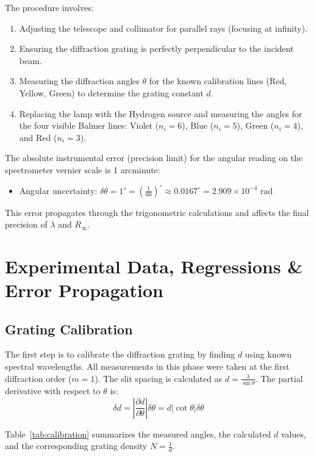 \documentclass[a4paper,11pt]{article}
\begin{document}
The procedure involves:
\begin{enumerate}
    \item Adjusting the telescope and collimator for parallel rays (focusing at infinity).
    \item Ensuring the diffraction grating is perfectly perpendicular to the incident beam.
    \item Measuring the diffraction angles $\theta$ for the known calibration lines (Red, Yellow, Green) to determine the grating constant $d$.
    \item Replacing the lamp with the Hydrogen source and measuring the angles for the four visible Balmer lines: Violet ($n_i=6$), Blue ($n_i=5$), Green ($n_i=4$), and Red ($n_i=3$).
\end{enumerate}

The absolute instrumental error (precision limit) for the angular reading on the spectrometer vernier scale is 1 arcminute:
\begin{itemize}
    \item Angular uncertainty: $\delta\theta = 1' = \left(\frac{1}{60}\right)^\circ \approx 0.0167^\circ = 2.909 \times 10^{-4}\text{ rad}$
\end{itemize}
This error propagates through the trigonometric calculations and affects the final precision of $\lambda$ and $R_\infty$.

\section{Experimental Data, Regressions \& Error Propagation}

\subsection{Grating Calibration}
The first step is to calibrate the diffraction grating by finding $d$ using known spectral wavelengths. All measurements in this phase were taken at the first diffraction order ($m=1$).
The slit spacing is calculated as $d = \frac{\lambda}{\sin\theta}$. The partial derivative with respect to $\theta$ is:
\begin{equation}
    \delta d = \left| \frac{\partial d}{\partial \theta} \right| \delta\theta = d |\cot\theta| \delta\theta
\end{equation}

Table~\ref{tab:calibration} summarizes the measured angles, the calculated $d$ values, and the corresponding grating density $N = \frac{1}{d}$.
\end{document}
